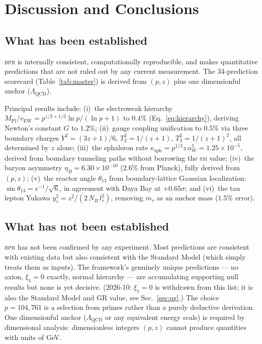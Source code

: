 \documentclass[aps,prd,twocolumn,superscriptaddress,longbibliography,nofootinbib]{revtex4-2}
\newcommand{\vEW}{v_{\mathrm{EW}}}
\newcommand{\MPl}{M_{\mathrm{Pl}}}
\newcommand{\bpr}{\textsc{bpr}}
\newcommand{\SM}{\textsc{sm}}
\begin{document}
\section{Discussion and Conclusions}
\label{sec:discussion}

\subsection{What has been established}

\bpr{} is internally consistent, computationally reproducible, and makes
quantitative predictions that are not ruled out by any current measurement.
The 34-prediction scorecard (Table~\ref{tab:master}) is derived from
$(p, z)$ plus one dimensionful anchor ($\Lambda_{\mathrm{QCD}}$).

Principal results include: (i)~the electroweak hierarchy
$\MPl/\vEW = p^{z/2+1/3}\ln p/(\ln p + 1)$ to $0.4\%$
(Eq.~\ref{eq:hierarchy}), deriving Newton's constant $G$ to $1.2\%$;
(ii)~gauge coupling unification to $0.5\%$ via three boundary charges
$Y^2 = (3z{+}1)/6$, $T_2^2 = 1/(z{+}1)$, $T_3^2 = 1/(z{+}1)^2$,
all determined by $z$ alone;
(iii)~the sphaleron rate $\kappa_{\mathrm{sph}} = p^{1/3} z\,\alpha_W^5
= 1.25\times10^{-5}$, derived from boundary tunneling paths without
borrowing the \SM{} value;
(iv)~the baryon asymmetry $\eta_B = 6.30\times10^{-10}$ ($2.6\%$ from
Planck), fully derived from $(p,z)$;
(v)~the reactor angle $\theta_{13}$ from boundary-lattice Gaussian
localization: $\sin\theta_{13} = e^{-1}/\!\sqrt{6}$, in agreement with
Daya Bay at $+0.65\sigma$;
and (vi)~the tau lepton Yukawa $y_\tau^2 = z^2/(2\,N_B\,l_\tau^2)$,
removing $m_\tau$ as an anchor mass ($1.5\%$ error).

\subsection{What has not been established}

\bpr{} has not been confirmed by any experiment.  Most predictions are
consistent with existing data but also consistent with the Standard Model
(which simply treats them as inputs).  The framework's genuinely unique
predictions --- no axion, $\xi_1 = 0$ exactly, normal hierarchy --- are
accumulating supporting null results but none is yet decisive.
(2026-10: $\xi_1 = 0$ is withdrawn from this list; it is also the
Standard Model and GR value, see Sec.~\ref{sec:qg}.)  The choice
$p = 104{,}761$ is a selection from primes rather than a purely deductive
derivation.  One dimensionful anchor ($\Lambda_{\mathrm{QCD}}$ or any
equivalent energy scale) is required by dimensional analysis: dimensionless
integers $(p, z)$ cannot produce quantities with units of GeV.
\end{document}
